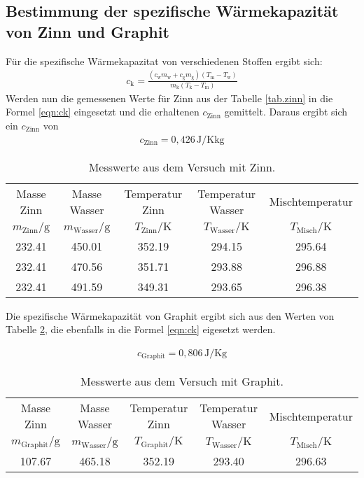 \subsection{Bestimmung der spezifische Wärmekapazität von Zinn und Graphit}
Für die spezifische Wärmekapazitat von verschiedenen Stoffen ergibt sich:
\begin{align}
c_\mathrm{k}=\frac{(c_\mathrm{w} m_\mathrm{w}+c_\mathrm{g} m_\mathrm{g})(T_\mathrm{m}-T_\mathrm{w})}{m_\mathrm{k}(T_\mathrm{k}-T_\mathrm{m})}\label{eqn:ck}
\end{align}
Werden nun die gemessenen Werte für Zinn aus der Tabelle \ref{tab.zinn} in die Formel \eqref{eqn:ck} eingesetzt und die erhaltenen $c_{\mathrm{Zinn}}$ gemittelt.
Daraus ergibt sich ein $c_{\mathrm{Zinn}}$ von
\begin{align*}
c_\mathrm{Zinn} =  0,426 \,\si{\joule\per\kelvin\kilo\gram}
\end{align*}
\begin{table}
  \centering
  \caption{Messwerte aus dem Versuch mit Zinn.}
  \label{tab:zinn}
   \begin{tabular}{c c c c c}
\toprule
Masse Zinn & Masse Wasser & Temperatur Zinn & Temperatur Wasser  & Mischtemperatur \\
$m_\mathrm{Zinn}/\si{\gram}$ & $m_\mathrm{Wasser}/\si{\gram}$ & $T_\mathrm{Zinn}/\si{\kelvin}$ & $T_\mathrm{Wasser}/\si{\kelvin}$ & $T_\mathrm{Misch}/\si{\kelvin}$ \\
\midrule
     232.41 &   450.01 &  352.19 &   294.15  &   295.64 \\
     232.41 &   470.56 &  351.71 &   293.88  &   296.88 \\
     232.41 &   491.59 &  349.31 &   293.65  &   296.38 \\
\bottomrule
\end{tabular}
\end{table}

Die spezifische Wärmekapazität von Graphit ergibt sich aus den Werten von Tabelle \ref{tab:graphit},
die ebenfalls in die Formel \eqref{eqn:ck} eigesetzt werden.

\begin{align*}
c_\mathrm{Graphit} = 0,806 \,\si{\joule\per\kelvin\gram}
\end{align*}
\begin{table}
  \centering
  \caption{Messwerte aus dem Versuch mit Graphit.}
  \label{tab:graphit}
   \begin{tabular}{c c c c c}
\toprule
Masse Zinn & Masse Wasser & Temperatur Zinn & Temperatur Wasser  & Mischtemperatur \\
$m_\mathrm{Graphit}/\si{\gram}$ & $m_\mathrm{Wasser}/\si{\gram}$ & $T_\mathrm{Graphit}/\si{\kelvin}$ & $T_\mathrm{Wasser}/\si{\kelvin}$ & $T_\mathrm{Misch}/\si{\kelvin}$ \\
\midrule
107.67 & 465.18 & 352.19 & 293.40 & 296.63 \\
\bottomrule
\end{tabular}
\end{table}




